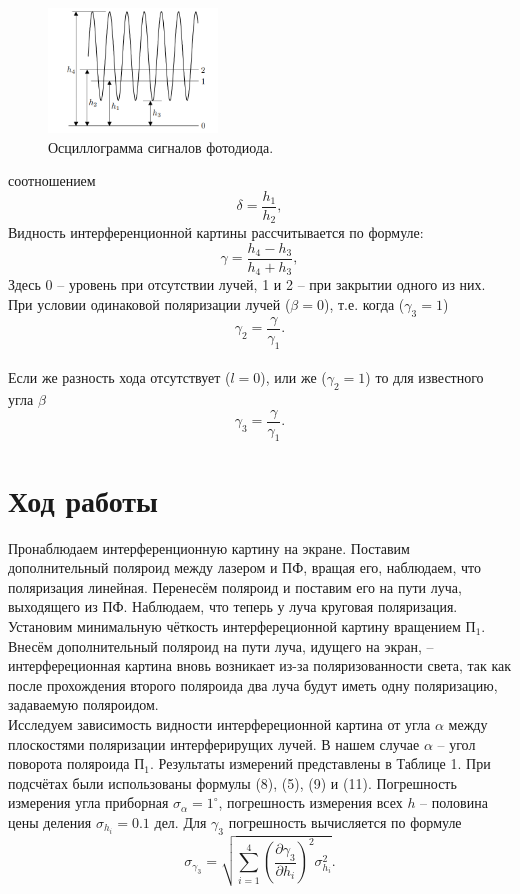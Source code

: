 \documentclass[a4paper, 12pt]{article}%
\begin{document}
\begin{figure}
\begin{center}
\includegraphics[width = 0.4\textwidth]{3.png}
\vspace{-40pt}
\end{center}
\caption{Осциллограмма сигналов фотодиода.}
\end{figure}

соотношением
\begin{equation}
\delta = \dfrac{h_1}{h_2},
\end{equation}
Видность интерференционной картины рассчитывается по формуле: 
\begin{equation}
\gamma = \dfrac{h_4 - h_3}{h_4 + h_3},
\end{equation}
Здесь 0 -- уровень при отсутствии лучей, 1 и 2 -- при закрытии одного из них.\\ 
При условии одинаковой поляризации лучей ($\beta = 0$), т.е. когда ($\gamma_3 = 1$)
\begin{equation}
\gamma_2 = \dfrac{\gamma}{\gamma_1}.
\end{equation}
\\ Если же разность хода отсутствует ($l = 0$), или же ($\gamma_2 = 1$) то для известного угла $\beta$
\begin{equation}
\gamma_3 = \dfrac{\gamma}{\gamma_1}.
\end{equation}
\section*{Ход работы}
Пронаблюдаем интерференционную картину на экране. Поставим дополнительный поляроид между лазером и ПФ, вращая его, наблюдаем, что поляризация линейная. Перенесём поляроид и поставим его на пути луча, выходящего из ПФ. Наблюдаем, что теперь у луча круговая поляризация. Установим минимальную чёткость интерфереционной картину вращением $\text{П}_1$. Внесём дополнительный поляроид на пути луча, идущего на экран, -- интерфереционная картина вновь возникает из-за поляризованности света, так как после прохождения второго поляроида два луча будут иметь одну поляризацию, задаваемую поляроидом.\\
Исследуем зависимость видности интерфереционной картина от угла $\alpha$ между плоскостями поляризации интерферирущих лучей. В нашем случае $\alpha$ -- угол поворота поляроида $\text{П}_1$. Результаты измерений представлены в Таблице 1. При подсчётах были использованы формулы (8), (5), (9) и (11). Погрешность измерения угла приборная $\sigma_\alpha = 1^\circ$, погрешность измерения всех $h$ -- половина цены деления $\sigma_{h_i} = 0.1 \text{ дел}$. Для $\gamma_3$ погрешность вычисляется по формуле 
$$
\sigma_{\gamma_3} = \sqrt{\sum\limits_{i=1}^4\left(\dfrac{\partial \gamma_3}{\partial h_i}\right)^2 \sigma^2_{h_i}}.
$$
\end{document}
